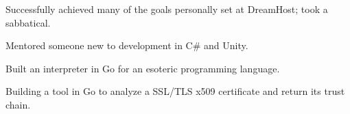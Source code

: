 \item Successfully achieved many of the goals personally set at DreamHost; took a sabbatical.
\item Mentored someone new to development in C\# and Unity.
\item Built an interpreter in Go for an esoteric programming language. %
\item Building a tool in Go to analyze a SSL/TLS x509 certificate and return its trust chain.
